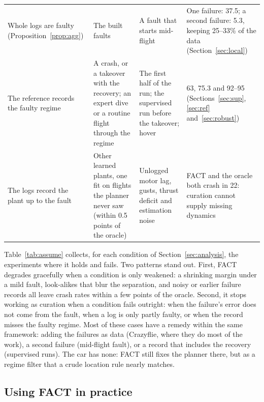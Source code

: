 \documentclass[preprint,12pt]{elsarticle}
\newcommand{\method}{FACT}
\begin{document}
\begin{table}[p]
\begin{tabular}{@{}L{0.19\textwidth}L{0.21\textwidth}L{0.24\textwidth}L{0.3\textwidth}@{}}
Whole logs are faulty (Proposition~\ref{prop:agg}) & The built faults & A fault that starts mid-flight & One failure: 37.5; a second failure: 5.3, keeping 25--33\% of the data (Section~\ref{sec:local}) \\
The reference records the faulty regime & A crash, or a takeover with the recovery; an expert dive or a routine flight through the regime & The first half of the run; the supervised run before the takeover; hover & 63, 75.3 and 92--95 (Sections~\ref{sec:sup}, \ref{sec:ref} and~\ref{sec:robust}) \\
The logs record the plant up to the fault & Other learned plants, one fit on flights the planner never saw (within 0.5 points of the oracle) & Unlogged motor lag, gusts, thrust deficit and estimation noise & \method{} and the oracle both crash in 22: curation cannot supply missing dynamics \\
\bottomrule
\end{tabular}
\end{table}

Table~\ref{tab:assume} collects, for each condition of Section~\ref{sec:analysis}, the experiments where it holds and fails. Two patterns stand out. First, \method{} degrades gracefully when a condition is only weakened: a shrinking margin under a mild fault, look-alikes that blur the separation, and noisy or earlier failure records all leave crash rates within a few points of the oracle. Second, it stops working as curation when a condition fails outright: when the failure's error does not come from the fault, when a log is only partly faulty, or when the record misses the faulty regime. Most of these cases have a remedy within the same framework: adding the failures as data (Crazyflie, where they do most of the work), a second failure (mid-flight fault), or a record that includes the recovery (supervised runs). The car has none: \method{} still fixes the planner there, but as a regime filter that a crude location rule nearly matches.

\subsection{Using \method{} in practice}\label{sec:practice}
\end{document}
